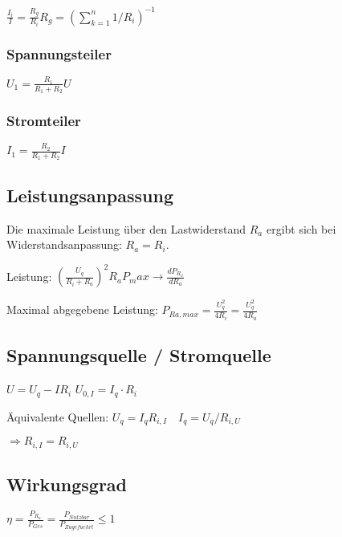 \documentclass[10pt,a4paper]{scrartcl}
\begin{document}
\begin{multicols*}{3}
	$\frac{I_i}{I}=\frac{R_g}{R_i} $\hfill		$R_g=(\sum_{k=1}^n{1/R_i})^{-1}$

	 
	
	\begin{multicols*}{2}
	\subsubsection{Spannungsteiler}
	
	$U_1=\frac{R_1}{R_1+R_2}U$
	
	
	\subsubsection{Stromteiler}
	
	$I_1=\frac{R_2}{R_1+R_2}I$
	
	
	\end{multicols*}
	\vspace{-3ex}
	
	\subsection{Leistungsanpassung}
	
	Die maximale Leistung über den Lastwiderstand $R_a$ ergibt sich bei Widerstandsanpassung: $R_a=R_i$.
	
	Leistung: $(\frac{U_q}{R_i+R_a})^2 R_a$\hfill$P_max \rightarrow \frac{dP_{R_a}}{dR_a}$
	
	Maximal abgegebene Leistung: $P_{Ra,max}=\frac{U_q^2}{4R_i}=\frac{U_q^2}{4R_a}$
	
	
	\subsection{Spannungsquelle / Stromquelle}
	
	$U=U_q-IR_i$\hfill {} \hfill$U_{0,I}=I_q\cdot R_i$
	
	
	Äquivalente Quellen: $U_q=I_q R_{i,I}\quad I_q=U_q/R_{i,U}$
	
	$\Rightarrow R_{i,I}=R_{i,U}$ 
	
	\subsection{Wirkungsgrad}
	
	$\eta=\frac{P_{R_a}}{P_{Ges}}=\frac{P_{Nutzbar}}{P_{Zugefuehrt}} \leq 1$
	

\end{multicols*}
\end{document}
